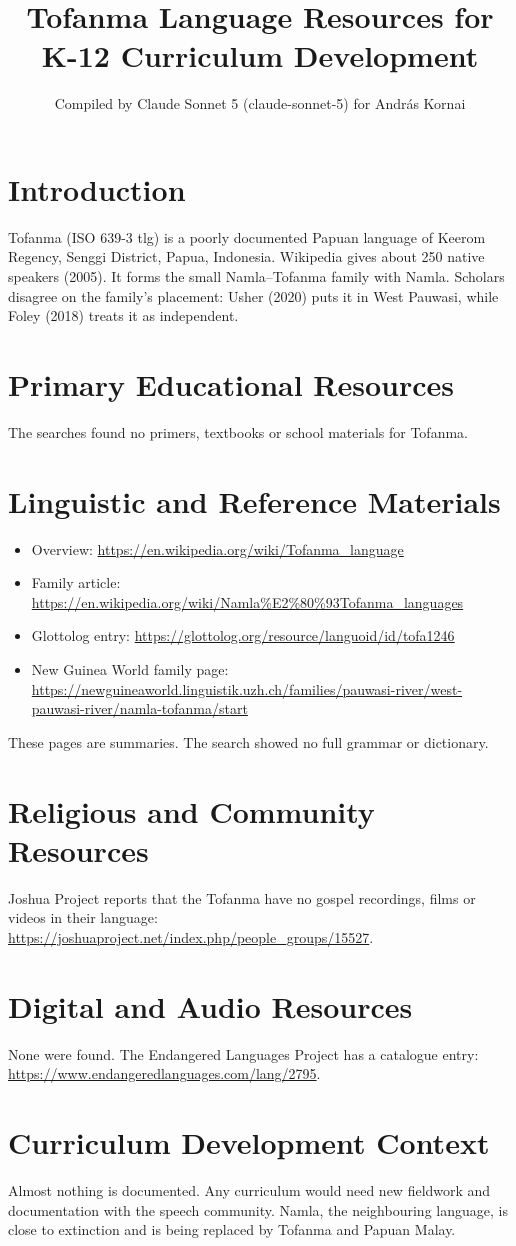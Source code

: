\documentclass[12pt]{article}
\title{Tofanma Language Resources for K-12 Curriculum Development}
\author{Compiled by Claude Sonnet 5 (claude-sonnet-5) for Andr\'as Kornai}
\date{}
\begin{document}
\maketitle

\section{Introduction}
Tofanma (ISO 639-3 tlg) is a poorly documented Papuan language of Keerom Regency, Senggi District, Papua, Indonesia. Wikipedia gives about 250 native speakers (2005). It forms the small Namla--Tofanma family with Namla. Scholars disagree on the family's placement: Usher (2020) puts it in West Pauwasi, while Foley (2018) treats it as independent.

\section{Primary Educational Resources}
The searches found no primers, textbooks or school materials for Tofanma.

\section{Linguistic and Reference Materials}
\begin{itemize}
\item Overview: \url{https://en.wikipedia.org/wiki/Tofanma_language}
\item Family article: \url{https://en.wikipedia.org/wiki/Namla\%E2\%80\%93Tofanma_languages}
\item Glottolog entry: \url{https://glottolog.org/resource/languoid/id/tofa1246}
\item New Guinea World family page: \url{https://newguineaworld.linguistik.uzh.ch/families/pauwasi-river/west-pauwasi-river/namla-tofanma/start}
\end{itemize}
These pages are summaries. The search showed no full grammar or dictionary.

\section{Religious and Community Resources}
Joshua Project reports that the Tofanma have no gospel recordings, films or videos in their language: \url{https://joshuaproject.net/index.php/people_groups/15527}.

\section{Digital and Audio Resources}
None were found. The Endangered Languages Project has a catalogue entry: \url{https://www.endangeredlanguages.com/lang/2795}.

\section{Curriculum Development Context}
Almost nothing is documented. Any curriculum would need new fieldwork and documentation with the speech community. Namla, the neighbouring language, is close to extinction and is being replaced by Tofanma and Papuan Malay.
\end{document}
